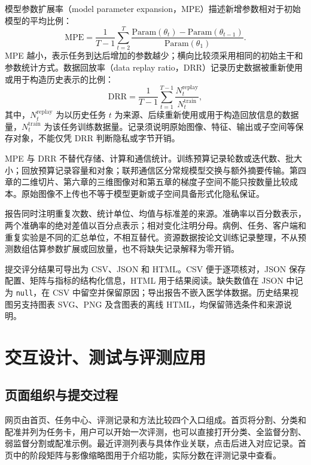 模型参数扩展率（model parameter expansion，MPE）描述新增参数相对于初始模型的平均比例：
\begin{equation}
\mathrm{MPE}
=
\frac{1}{T-1}
\sum_{t=2}^{T}
\frac{
\mathrm{Param}(\theta_t)-\mathrm{Param}(\theta_{t-1})
}{
\mathrm{Param}(\theta_1)
}.
\label{eq:benchmark-mpe}
\end{equation}
MPE 越小，表示任务到达后增加的参数越少；横向比较须采用相同的初始主干和参数统计方式。数据回放率（data replay ratio，DRR）记录历史数据被重新使用或用于构造历史表示的比例：
\begin{equation}
\mathrm{DRR}
=
\frac{1}{T-1}
\sum_{t=1}^{T-1}
\frac{
N_t^{\mathrm{replay}}
}{
N_t^{\mathrm{train}}
},
\label{eq:benchmark-drr}
\end{equation}
其中，$N_t^{\mathrm{replay}}$ 为以历史任务 $t$ 为来源、后续重新使用或用于构造回放信息的数据量，$N_t^{\mathrm{train}}$ 为该任务训练数据量。记录须说明原始图像、特征、输出或子空间等保存对象，不能仅凭 DRR 判断隐私或字节开销。

MPE 与 DRR 不替代存储、计算和通信统计。训练预算记录轮数或迭代数、批大小；回放预算记录容量和对象；联邦通信区分常规模型交换与额外摘要传输。第四章的二维切片、第六章的三维图像对和第五章的梯度子空间不能只按数量比较成本。原始图像不上传也不等于模型更新或子空间具备形式化隐私保证。

报告同时注明重复次数、统计单位、均值与标准差的来源。准确率以百分数表示，两个准确率的绝对差值以百分点表示；相对变化注明分母。病例、任务、客户端和重复实验是不同的汇总单位，不相互替代。资源数据按论文训练记录整理，不从预测数组估算参数扩展或回放量，也不将缺失记录解释为零开销。

提交评分结果可导出为 CSV、JSON 和 HTML。CSV 便于逐项核对，JSON 保存配置、矩阵与指标的结构化信息，HTML 用于结果阅读。缺失数值在 JSON 中记为 \texttt{null}，在 CSV 中留空并保留原因；导出报告不嵌入医学体数据。历史结果视图另支持图表 SVG、PNG 及含图表的离线 HTML，均保留筛选条件和来源说明。


\section{交互设计、测试与评测应用}
\label{sec:medcl-ui-test}

\subsection{页面组织与提交过程}
\label{subsec:medcl-workflow}

网页由首页、任务中心、评测记录和方法比较四个入口组成。首页将分割、分类和配准并列为任务卡，用户可以开始一次评测，也可以直接打开分类、全监督分割、弱监督分割或配准示例。最近评测列表与具体作业关联，点击后进入对应记录。首页中的阶段矩阵与影像缩略图用于介绍功能，实际分数在评测记录中查看。


